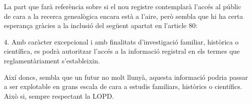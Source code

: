     La part que farà referència sobre si el nou registre contemplarà l'accés al públic de cara a la recerca genealògica encara està a l'aire, però sembla que hi ha certa esperança gràcies a la inclusió del següent apartat en l'article 80:

    \begin{displayquote}
        4. Amb caràcter excepcional i amb finalitats d'investigació familiar, històrica o científica, es podrà autoritzar l'accés a la informació registral en els termes que reglamentàriament s'estableixin.
    \end{displayquote}

    Així doncs, sembla que un futur no molt llunyà, aquesta informació podria passar a ser explotable en grans escala de cara a estudis familiars, històrics o científics. Això si, sempre respectant la \gls{LOPD}.
